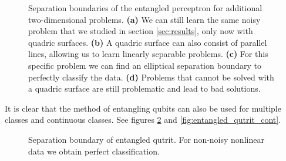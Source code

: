 \begin{figure}[htb!]
        \caption{Separation boundaries of the entangled perceptron for additional two-dimensional problems. \textbf{(a)} We can still learn the same noisy problem that we studied in section \ref{sec:results}, only now with quadric surfaces. \textbf{(b)} A quadric surface can also consist of parallel lines, allowing us to learn linearly separable problems. \textbf{(c)} For this specific problem we can find an elliptical separation boundary to perfectly classify the data. \textbf{(d)} Problems that cannot be solved with a quadric surface are still problematic and lead to bad solutions.} 
        \label{fig:3_problems}
    \end{figure}
    
\clearpage
\noindent It is clear that the method of entangling qubits can also be used for multiple classes and continuous classes. See figures \ref{fig:entangled_qutrit} and \ref{fig:entangled_qutrit_cont}. 

\begin{figure}[htb!]
    \centering
    \caption{Separation boundary of entangled qutrit. For non-noisy nonlinear data we obtain perfect classification.}
    \label{fig:entangled_qutrit}
\end{figure}

